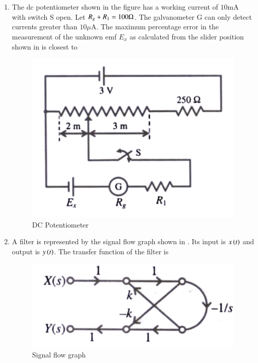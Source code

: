 \documentclass[journal,12pt,onecolumn]{IEEEtran}
\theoremstyle{remark}
\begin{document}
\begin{enumerate}
 
\item The dc potentiometer shown in the figure has a working current of $10\text{mA}$ with switch S open. Let $R_g+R_1=100\ohm$. The galvanometer G can only detect currents greater than $10\mu{\text{A}}$. The maximum percentage error in the measurement of the unknown emf $E_x$ as calculated from the slider position shown in  is closest to  \par  \hfill{}
\begin{figure}[H]
    \centering
    \includegraphics[width=0.4\columnwidth]{Figs/Q-43.jpg}
    \caption{DC Potentiometer}
    \label{fig:placeholder_13}
\end{figure}
\begin{enumerate}
\end{enumerate} 

 

\item A filter is represented by the signal flow graph shown in . Its input is $x\left(t\right)$ and output is $y\left(t\right)$. The transfer function of the filter is \par  \hfill{}
\begin{figure}[H]
    \centering
    \includegraphics[width=0.5\columnwidth]{Figs/Q-44.jpg}
    \caption{Signal flow graph}
    \label{fig:placeholder_14}
\end{figure} \par
\begin{enumerate}
\end{enumerate} 


\end{enumerate}
\end{document}
